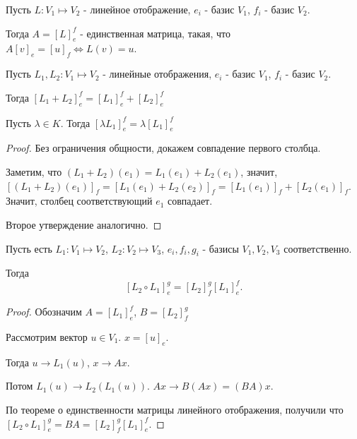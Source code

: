 \begin{statement} \thmslashn

    Пусть $L : V_1 \mapsto V_2$ - линейное отображение, $e_{i}$ - базис $V_1$, $f_{i}$ - базис $V_2$.

    Тогда $A = [L]_{e}^{f}$ - единственная матрица, такая, что $A[v]_{e} = [u]_{f} \iff L(v) = u$.
\end{statement}
\begin{statement} \thmslashn

    Пусть $L_1, L_2 : V_1 \mapsto V_2$ - линейные отображения, $e_{i}$ - базис $V_1$, $f_{i}$ - базис $V_2$.

    Тогда $[L_1 + L_2]_{e}^{f} = [L_1]_{e}^{f} + [L_{2}]_{e}^{f}$

    Пусть $\lambda\in K$. Тогда $[\lambda L_1]_{e}^{f} = \lambda [L_1]_{e}^{f}$
    \begin{proof} \thmslashn
    
        Без ограничения общности, докажем совпадение первого столбца.

        Заметим, что $(L_1 + L_2)(e_1) = L_1(e_1) + L_2(e_1)$, значит, $\left[(L_1+L_2)(e_1)\right]_{f} = \left[L_1(e_1) + L_2(e_2)\right]_{f} = \left[L_1(e_1)\right]_{f} + \left[L_2(e_1)\right]_{f}$. Значит, столбец соответствующий $e_1$ совпадает.

        Второе утверждение аналогично.
    \end{proof}
\end{statement}
\begin{statement} \thmslashn

    Пусть есть $L_1 : V_1 \mapsto V_2$, $L_2 : V_2 \mapsto V_3$, $e_{i}, f_{i}, g_{i}$ - базисы $V_1, V_2, V_3$ соответственно.

    Тогда
    \[ \left[L_2 \circ L_1\right]_{e}^{g} = \left[L_2\right]_{f}^{g}\left[L_1\right]_{e}^{f} .\]
    \begin{proof} \thmslashn
        
        Обозначим $A = \left[L_1\right]_{e}^{f}$, $B = \left[L_2\right]_{f}^{g}$

        Рассмотрим вектор $u\in V_1$. $x = [u]_{e}$.

        Тогда $u \to L_1(u)$, $x \to Ax$.

        Потом $L_1(u) \to L_2(L_1(u))$. $Ax \to B(Ax) = (BA)x$.

        По теореме о единственности матрицы линейного отображения, получили что $\left[L_2 \circ L_1\right]_{e}^{g} = BA = [L_2]_{f}^{g}[L_1]_{e}^{f}$.
    \end{proof}
\end{statement}
